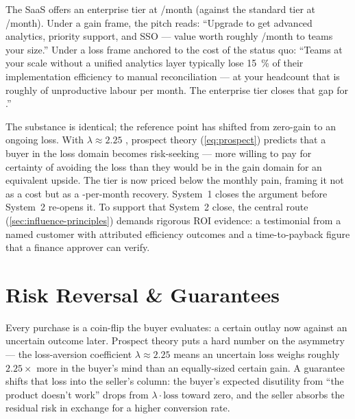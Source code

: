 \begin{example}
The SaaS offers an enterprise tier at /month (against the standard tier at
/month). Under a gain frame, the pitch reads: ``Upgrade to get advanced
analytics, priority support, and SSO --- value worth roughly /month to teams
your size.'' Under a loss frame anchored to the cost of the status quo: ``Teams at your
scale without a unified analytics layer typically lose \qty{15}{\percent} of their
implementation efficiency to manual reconciliation --- at your headcount that is roughly
 of unproductive labour per month. The enterprise tier closes that gap for
.''

The substance is identical; the reference point has shifted from zero-gain to an ongoing
loss. With $\lambda \approx 2.25$ \parencite{tversky1992cumulative}, prospect theory
(\cref{eq:prospect}) predicts that a buyer in the loss domain becomes risk-seeking ---
more willing to pay for certainty of avoiding the loss than they would be in the gain
domain for an equivalent upside. The  tier is now priced below the
 monthly pain, framing it not as a cost but as a -per-month
recovery. System~1 closes the argument before System~2 re-opens it. To support that
System~2 close, the central route (\cref{sec:influence-principles}) demands rigorous
ROI evidence: a testimonial from a named customer with attributed efficiency outcomes
and a time-to-payback figure that a finance approver can verify.
\end{example}


\section{Risk Reversal \& Guarantees}\label{sec:risk-reversal}

Every purchase is a coin-flip the buyer evaluates: a certain outlay now against an uncertain outcome later. Prospect theory \parencite{tversky1992cumulative} puts a hard number on the asymmetry --- the loss-aversion coefficient $\lambda \approx 2.25$ means an uncertain loss weighs roughly $2.25 \times$ more in the buyer's mind than an equally-sized certain gain. A guarantee shifts that loss into the seller's column: the buyer's expected disutility from ``the product doesn't work'' drops from $\lambda \cdot \text{loss}$ toward zero, and the seller absorbs the residual risk in exchange for a higher conversion rate.

